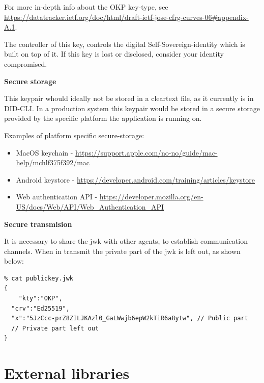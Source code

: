 For more in-depth info about the OKP key-type, see
\url{https://datatracker.ietf.org/doc/html/draft-ietf-jose-cfrg-curves-06\#appendix-A.1}.

The controller of this key, controls the digital Self-Sovereign-identity
which is built on top of it. If this key is lost or disclosed, consider
your identity compromised.

\textbf{Secure storage}

This keypair whould ideally not be stored in a cleartext file, as it
currently is in DID-CLI. In a production system this keypair would be
stored in a secure storage provided by the specific platform the
application is running on.

Examples of platform specific secure-storage:

\begin{itemize}
\tightlist
\item
  MacOS keychain -
  \url{https://support.apple.com/no-no/guide/mac-help/mchlf375f392/mac}
\item
  Android keystore -
  \url{https://developer.android.com/training/articles/keystore}
\item
  Web authentication API -
  \url{https://developer.mozilla.org/en-US/docs/Web/API/Web_Authentication_API}
\end{itemize}

\textbf{Secure transmision}

It is necessary to share the jwk with other agents, to establish
communication channels. When in transmit the private part of the jwk is
left out, as shown below:

\begin{lstlisting}
% cat publickey.jwk 
{
    "kty":"OKP",
  "crv":"Ed25519",
  "x":"5JzCcc-prZ8ZILJKAzl0_GaLWwjb6epW2kTiR6a8ytw", // Public part
  // Private part left out
} 
\end{lstlisting}

\hypertarget{external-libraries}{%
\section{External libraries}\label{external-libraries}}

